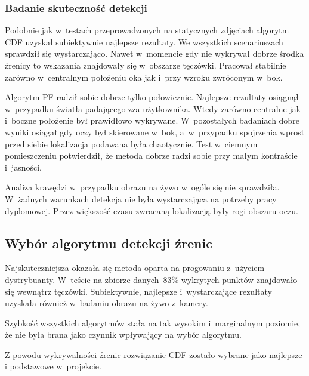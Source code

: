 \subsubsection{Badanie skuteczność detekcji}

Podobnie jak w~testach przeprowadzonych na statycznych zdjęciach algorytm CDF uzyskał subiektywnie najlepsze rezultaty. We wszystkich scenariuszach sprawdził się wystarczająco. Nawet w~momencie gdy nie wykrywał dobrze środka źrenicy to wskazania znajdowały się w~obszarze tęczówki. Pracował stabilnie zarówno w~centralnym położeniu oka jak i~przy wzroku zwróconym w~bok. 

\par 

Algorytm PF radził sobie dobrze tylko połowicznie. Najlepsze rezultaty osiągnął w~przypadku światła padającego zza użytkownika. Wtedy zarówno centralne jak i~boczne położenie był prawidłowo wykrywane. W~pozostałych badaniach dobre wyniki osiągał gdy oczy był skierowane w~bok, a~w~przypadku spojrzenia wprost przed siebie lokalizacja podawana była chaotycznie. Test w~ciemnym pomieszczeniu potwierdził, że metoda dobrze radzi sobie przy małym kontraście i~jasności. 

\par

Analiza krawędzi w~przypadku obrazu na żywo w~ogóle się nie sprawdziła. W~żadnych warunkach detekcja nie była wystarczająca na potrzeby pracy dyplomowej. Przez większość czasu zwracaną lokalizacją były rogi obszaru oczu.


 

\subsection{Wybór algorytmu detekcji źrenic}

Najskuteczniejsza okazała się metoda oparta na progowaniu z~użyciem dystrybuanty. W~teście na zbiorze danych~$83\%$ wykrytych punktów znajdowało się wewnątrz tęczówki. Subiektywnie, najlepsze i~wystarczające rezultaty uzyskała również w~badaniu obrazu na żywo z~kamery.

\par

Szybkość wszystkich algorytmów stała na tak wysokim i~marginalnym poziomie, że nie była brana jako czynnik wpływający na wybór algorytmu.

\par

Z powodu wykrywalności źrenic rozwiązanie CDF zostało wybrane jako najlepsze i podstawowe w~projekcie.